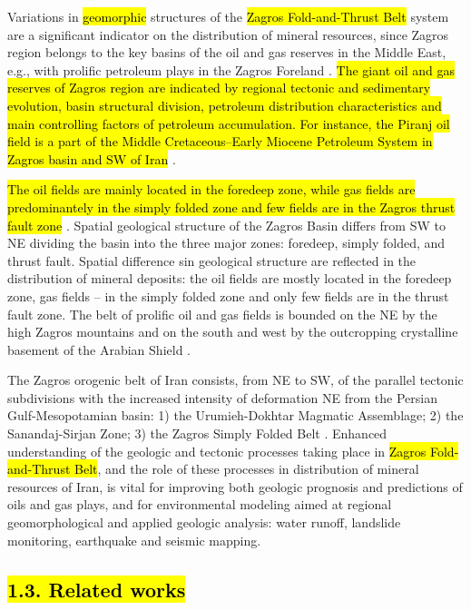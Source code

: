 \documentclass[12pt,a4paper,oneside]{article}
\def \newpar{\vspace{6pt}}
\begin{document}
\newpar Variations in \hl{geomorphic} structures of the \hl{Zagros Fold-and-Thrust Belt} system are a significant indicator on the distribution of mineral resources, since Zagros region belongs to the key basins of the oil and gas reserves in the Middle East, e.g., with prolific petroleum plays in the Zagros Foreland \citep{Bosold}. \hl{The giant oil and gas reserves of Zagros region are indicated by regional tectonic and sedimentary evolution, basin structural division, petroleum distribution characteristics and main controlling factors of petroleum accumulation. For instance, the Piranj oil field is a part of the Middle Cretaceous--Early Miocene Petroleum System in Zagros basin and SW of Iran} \citep{ELYASI2016448}. 

\newpar \hl{The oil fields are mainly located in the foredeep zone, while gas fields are predominantely in the simply folded zone and few fields are in the Zagros thrust fault zone} \citep{LIU2018273}. Spatial geological structure of the Zagros Basin differs from SW to NE dividing the basin into the three major zones: foredeep, simply folded, and thrust fault. Spatial difference sin geological structure are reflected in the distribution of mineral deposits: the oil fields are mostly located in the foredeep zone, gas fields – in the simply folded zone and only few fields are in the thrust fault zone. The belt of prolific oil and gas fields is bounded on the NE by the high Zagros mountains and on the south and west by the outcropping crystalline basement of the Arabian Shield \citep{Beydoun}. 

\newpar The Zagros orogenic belt of Iran consists, from NE to SW, of the parallel tectonic subdivisions with the increased intensity of deformation NE from the Persian Gulf-Mesopotamian basin: 1) the Urumieh-Dokhtar Magmatic Assemblage; 2)  the Sanandaj-Sirjan Zone; 3) the Zagros Simply Folded Belt \citep{Alavi1994}. Enhanced understanding of the geologic and tectonic processes taking place in \hl{Zagros Fold-and-Thrust Belt}, and the role of these processes in distribution of mineral resources of Iran, is vital for improving both geologic prognosis and predictions of oils and gas plays, and for environmental modeling aimed at regional geomorphological and applied geologic analysis: water runoff, landslide monitoring, earthquake and seismic mapping.

\subsection*{\hl{1.3. Related works}}
\end{document}
